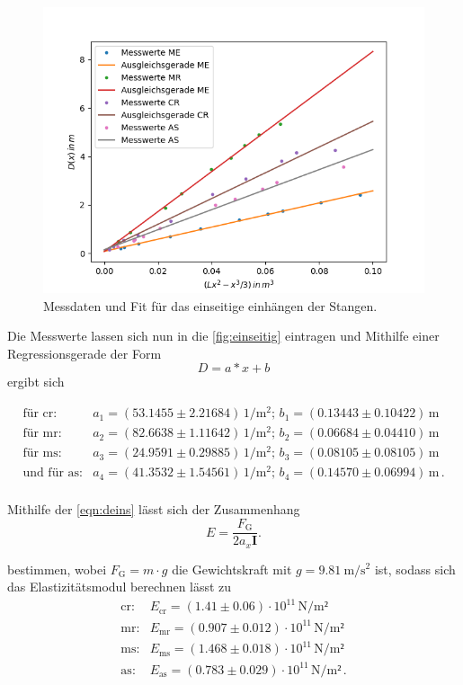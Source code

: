 \begin{figure}[H]
	\centering
	\includegraphics{Daten/AS1.png}
	\caption{Messdaten und Fit für das einseitige einhängen der Stangen.}
	\label{fig:einseitig}
\end{figure}

\noindent
Die Messwerte lassen sich nun in die \autoref{fig:einseitig} eintragen und Mithilfe einer Regressionsgerade der Form $$ D = a*x + b$$ ergibt sich

\begin{align*}
    \text{für cr}:& a_1 = (53.1455 \pm 2.21684) \, \si{1\per\meter^2} ; \, b_1 = (0.13443\pm 0.10422) \, \si{\meter}  \\
    \text{für mr}:& a_2 = (82.6638 \pm 1.11642 ) \, \si{1\per\meter^2} ;\, b_2 = (0.06684\pm 0.04410) \, \si{\meter}  \\
    \text{für ms}:& a_3 = (24.9591 \pm 0.29885) \, \si{1\per\meter^2} ; \, b_3 = (0.08105\pm 0.08105) \, \si{\meter}  \\
\text{und für as}:& a_4 = (41.3532 \pm 1.54561) \, \si{1\per\meter^2} ;\,  b_4 = (0.14570\pm 0.06994) \, \si{\meter} \, .\\
\end{align*} 

\noindent
Mithilfe der \autoref{eqn:deins} lässt sich der Zusammenhang
\begin{equation*}
    E = \frac{F_\text{G}}{2a_x\symbf{I}}.
\end{equation*}

\noindent
bestimmen, wobei $F_\text{G}= m \cdot g$ die Gewichtskraft mit $g = \SI{9.81}{\meter\per\second\squared}$ ist, sodass sich das Elastizitätsmodul berechnen lässt zu 
\begin{align*}
    \text{cr}:& E_\text{cr} = (1.41 \pm 0.06  ) \cdot 10^{11} \, \si{\newton\per\meter²}\\
    \text{mr}:& E_\text{mr} = (0.907 \pm 0.012) \cdot 10^{11} \, \si{\newton\per\meter²}\\
    \text{ms}:& E_\text{ms} = (1.468 \pm 0.018) \cdot 10^{11} \, \si{\newton\per\meter²}\\
    \text{as}:& E_\text{as} = (0.783\pm 0.029 ) \cdot 10^{11} \, \si{\newton\per\meter²} \, .\\
\end{align*} 

